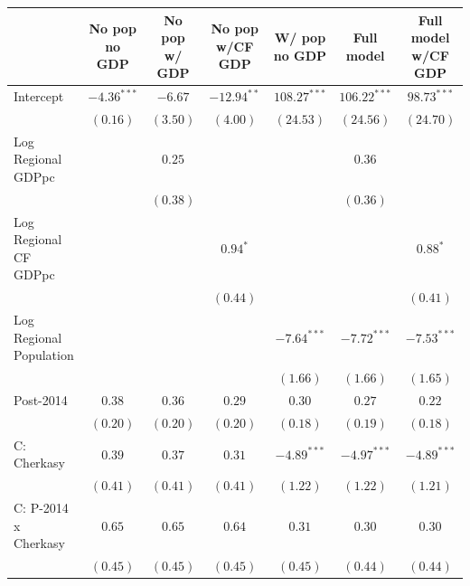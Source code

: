 
\begin{table}
\begin{center}
\begin{small}
\begin{tabular}{l c c c c c c}
\hline
 & No pop
no GDP & No pop
w/ GDP & No pop 
w/CF GDP & W/ pop
no GDP & Full model & Full model w/CF GDP \\
\hline
Intercept                   & $-4.36^{***}$ & $-6.67$      & $-12.94^{**}$ & $108.27^{***}$ & $106.22^{***}$ & $98.73^{***}$  \\
                            & $(0.16)$      & $(3.50)$     & $(4.00)$      & $(24.53)$      & $(24.56)$      & $(24.70)$      \\
Log Regional GDPpc          &               & $0.25$       &               &                & $0.36$         &                \\
                            &               & $(0.38)$     &               &                & $(0.36)$       &                \\
Log Regional CF GDPpc       &               &              & $0.94^{*}$    &                &                & $0.88^{*}$     \\
                            &               &              & $(0.44)$      &                &                & $(0.41)$       \\
Log Regional Population     &               &              &               & $-7.64^{***}$  & $-7.72^{***}$  & $-7.53^{***}$  \\
                            &               &              &               & $(1.66)$       & $(1.66)$       & $(1.65)$       \\
Post-2014                   & $0.38$        & $0.36$       & $0.29$        & $0.30$         & $0.27$         & $0.22$         \\
                            & $(0.20)$      & $(0.20)$     & $(0.20)$      & $(0.18)$       & $(0.19)$       & $(0.18)$       \\
C: Cherkasy                 & $0.39$        & $0.37$       & $0.31$        & $-4.89^{***}$  & $-4.97^{***}$  & $-4.89^{***}$  \\
                            & $(0.41)$      & $(0.41)$     & $(0.41)$      & $(1.22)$       & $(1.22)$       & $(1.21)$       \\
C: P-2014 x Cherkasy        & $0.65$        & $0.65$       & $0.64$        & $0.31$         & $0.30$         & $0.30$         \\
                            & $(0.45)$      & $(0.45)$     & $(0.45)$      & $(0.45)$       & $(0.44)$       & $(0.44)$       \\

\end{tabular}
\end{small}
\end{center}
\end{table}
